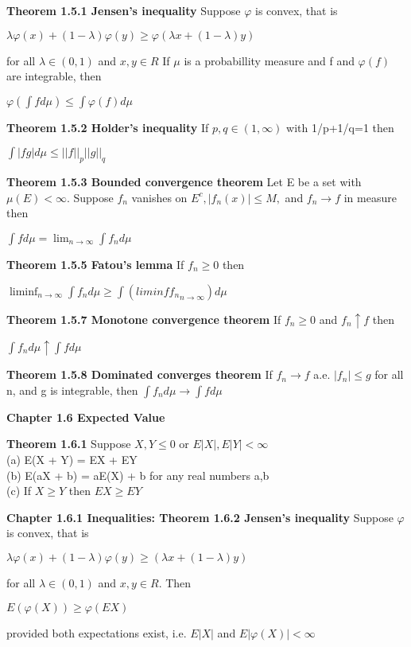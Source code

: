 \documentclass{article}
\begin{document}
\textbf {Theorem 1.5.1 Jensen's inequality} Suppose $\varphi$ is convex, that is 
\begin{center}
$\lambda \varphi (x) + (1 - \lambda) \varphi (y) \geq \varphi (\lambda x + (1 - \lambda)y)$
\end{center}
for all $\lambda \in (0,1)$ and $x, y \in R$ If $\mu$ is a probabillity measure and f and $\varphi(f)$ are integrable, then
\begin{center}
$\varphi (\int f d\mu) \leq \int \varphi(f) d\mu$
\end{center}

\textbf {Theorem 1.5.2 Holder's inequality} If $p, q \in (1, \infty)$ with 1/p+1/q=1 then
\begin{center}
$\int | f g| d\mu \leq ||f||_p ||g||_q$
\end{center}

\textbf {Theorem 1.5.3 Bounded convergence theorem} Let E be a set with $\mu(E) < \infty$. Suppose $f_n$ vanishes on $E^c, |f_n (x)| \leq M,$ and $f_n \rightarrow f$ in measure then
\begin{center}
$\int f d\mu =  \lim_{n \to \infty} \int f_n d\mu$
\end{center}

\textbf {Theorem 1.5.5 Fatou's lemma} If $f_n \geq 0$ then 
\begin{center}
$\liminf_{n \to \infty} \int f_n d\mu \geq \int (liminf {f_n}_{n \to \infty}) d\mu$
\end{center}

\textbf {Theorem 1.5.7 Monotone convergence theorem} If $f_n \geq 0$ and $f_n \uparrow f$ then
\begin{center}
$\int f_n d\mu \uparrow \int f d\mu$
\end{center}

\textbf {Theorem 1.5.8 Dominated converges theorem} If $f_n \rightarrow f$ a.e. $|f_n| \leq g$ for all n, and g is integrable, then $\int f_n d\mu \rightarrow \int f d\mu$

\textbf {Chapter 1.6 Expected Value}

\textbf {Theorem 1.6.1} Suppose $X,Y \leq 0$ or $E|X|, E|Y|<\infty$ \\
(a) E(X + Y) = EX + EY \\
(b) E(aX + b) = aE(X) + b for any real numbers a,b \\
(c) If $X \geq Y$ then $EX \geq EY$

\textbf {Chapter 1.6.1 Inequalities: Theorem 1.6.2 Jensen's inequality} Suppose $\varphi$ is convex, that is 
\begin{center}
$\lambda \varphi(x) + (1 - \lambda) \varphi(y) \geq (\lambda x + (1 - \lambda)y)$
\end{center}
for all $\lambda \in (0,1)$ and $x,y \in R$. Then
\begin{center}
$E(\varphi(X)) \geq \varphi(EX)$
\end{center}
provided both expectations exist, i.e. $E|X|$ and $E|\varphi(X)| < \infty$
\end{document}
